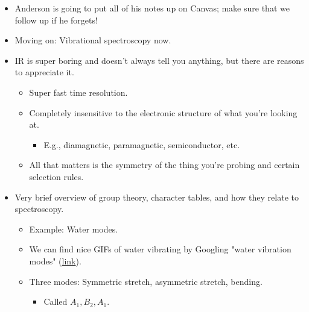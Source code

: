 \documentclass[../notes.tex]{subfiles}
\begin{document}
\begin{itemize}
\begin{itemize}
\begin{itemize}
            \item With good enough time resolution, the electron hopping rate is on the order of \SI{3e8}{\per\second}, so the lifetime $1/\nu$ is on the order of \SI{3.3e-7}{\second}. Look for an IVCT (inter-valence charge transfer).
            \item Visible and IR are the best techniques to use here. \SIrange{1000}{1600}{\nano\meter} is what you want to analyze these types of things.
        \end{itemize}
        \item Misc. note: Be aware when you're doing UV/Vis! Make sure there's not something extra at the far end of the spectrum that might actually be important.
    \end{itemize}
    \item Anderson is going to put all of his notes up on Canvas; make sure that we follow up if he forgets!
    \item Moving on: Vibrational spectroscopy now.
    \item IR is super boring and doesn't always tell you anything, but there are reasons to appreciate it.
    \begin{itemize}
        \item Super fast time resolution.
        \item Completely insensitive to the electronic structure of what you're looking at.
        \begin{itemize}
            \item E.g., diamagnetic, paramagnetic, semiconductor, etc.
        \end{itemize}
        \item All that matters is the symmetry of the thing you're probing and certain selection rules.
    \end{itemize}
    \item Very brief overview of group theory, character tables, and how they relate to spectroscopy.
    \begin{itemize}
        \item Example: Water modes.
        \item We can find nice GIFs of water vibrating by Googling "water vibration modes" (\href{https://www.chem.purdue.edu/jmol/vibs/h2o.html}{link}).
        \item Three modes: Symmetric stretch, asymmetric stretch, bending.
        \begin{itemize}
            \item Called $A_1,B_2,A_1$.

\end{itemize}
\end{itemize}
\end{itemize}
\end{document}
